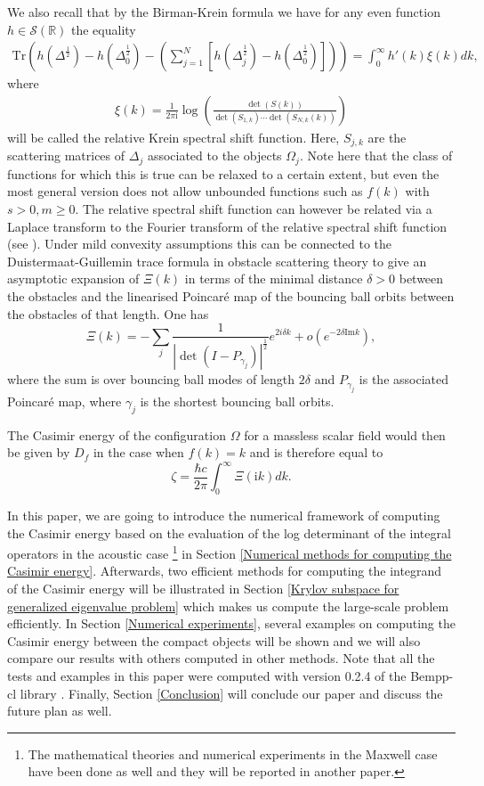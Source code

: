 We also recall that by the Birman-Krein formula we have for any even function $h \in \mathcal{S}(\mathbb{R})$ the equality
\begin{align}\label{B-K formula}
    \text{Tr}\left(h(\Delta^{\frac{1}{2}}) - h(\Delta_{0}^{\frac{1}{2}}) - \left(\sum_{j = 1}^{N}[h(\Delta_{j}^{\frac{1}{2}}) - h(\Delta_{0}^{\frac{1}{2}})]\right)\right)  = \int_{0}^{\infty}h'(k)\xi(k)dk,
\end{align}
where 
\begin{align*}
    \xi(k) = \frac{1}{2\pi \mathrm{i}}\log\left(\frac{\det(S(k))}{\det(S_{1,k})\cdots\det(S_{N,k}(k))}\right)
\end{align*}
will be called the relative Krein spectral shift function. Here, $S_{j,k}$ are the scattering matrices of $\Delta_{j}$ associated to the objects $\Omega_{j}$. Note here that the class of functions for which this is true can be relaxed to a certain extent, but even the most general version does not allow unbounded functions such as $f(k)$ with $s>0, m\geq 0$.
The relative spectral shift function can however be related via a Laplace transform to the Fourier transform of the relative spectral shift function (see \cite{fang2021singularity}). Under mild convexity assumptions this can be connected to the Duistermaat-Guillemin trace formula in obstacle scattering theory to give an asymptotic expansion of  $\Xi(k)$ 
in terms of the minimal distance $\delta>0$ between the obstacles and the linearised Poincar\'e map of the bouncing ball orbits between the obstacles of that length. One has
$$
 \Xi(k) =- \sum_{j} \frac{1}{|\det(I - P_{\gamma_j})|^{\frac{1}{2}}} e^{2 i \delta k} + o(e^{- 2 \delta \text{Im}{k}}),
$$
where the sum is over  bouncing ball modes of length $2 \delta$ and $P_{\gamma_j}$ is the associated Poincar\'e map, where $\gamma_{j}$ is the shortest bouncing ball orbits. 

The Casimir energy of the configuration $\Omega$ for a massless scalar field would then be given by $D_f$ in the case when $f(k)=k$ and is therefore equal to
$$
\zeta = \frac{\hbar c}{2 \pi} \int _{0}^{\infty} \Xi(\mathrm{i}k) dk.
$$

In this paper, we are going to introduce the numerical framework of computing the Casimir energy based on the evaluation of the log determinant of the integral 
operators in the acoustic case \footnote{The mathematical theories and numerical experiments in the Maxwell case have been done as well and they will be 
reported in another paper.} in Section \ref{Numerical methods for computing the Casimir energy}. Afterwards,
two efficient methods for computing the integrand of the Casimir energy will be illustrated in Section \ref{Krylov subspace for generalized eigenvalue problem}
which makes us compute the large-scale problem efficiently. In Section \ref{Numerical experiments}, several examples on computing the Casimir energy between 
the compact objects will be shown and we will also compare our results with others computed in other methods. Note that all the tests and examples in this paper were computed 
with version 0.2.4 of the Bempp-cl library \cite{scroggs2017software}. Finally, Section \ref{Conclusion} will conclude 
our paper and discuss the future plan as well.

